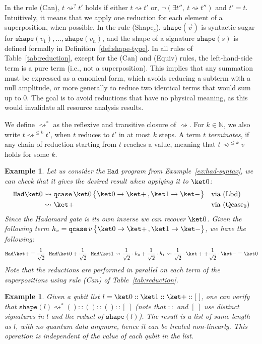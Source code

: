 \documentclass[10pt,a4paper]{article}
\newcommand{\vunit}{()}
\newcommand{\nil}{[~]}
\newcommand{\textqcase}{\ensuremath{\mathtt{qcase}}}
\newcommand{\zket}{\ket 0}
\newcommand{\oket}{\ket 1}
\newcommand{\qcasebase}[2]{
  \textqcase\,#1\left\{\! \begin{aligned} #2 \end{aligned}\right\}
}
\newcommand{\qcase}[3]{
  \qcasebase {#1} {\zket \to #2\,, \oket \to #3}
}
\newcommand{\shape}[1]{\mathtt{shape}(#1)}
\newcommand{\reduces}{\rightsquigarrow}
\newcommand{\sreduces}{\reduces^*}
\newcommand{\zoreduces}{\ensuremath{\reduces^?}}%
\newcommand{\mostreduces}[1]{\ensuremath{\reduces^{\leq #1}}}
\newcommand{\seq}[1]{\overrightarrow{#1}}
\newtheorem{example}[theorem]{Example}
\begin{document}
In the rule (Can), $t\zoreduces t'$  holds if either $t\reduces t'$
or, $\neg(\exists t'',\ t \reduces t'')$ and $t' = t$. Intuitively,
it means that we apply one reduction for each element of a
superposition, when possible.
In the rule (Shape$_c$), $\shape{\seq v}$ is syntactic sugar for $\shape{v_1},
\dots, \shape{v_n}$, and the shape of a signature $\shape s$ is defined
formally in Definition~\ref{def:shape-type}.
In all rules of Table~\ref{tab:reduction}, except for the (Can) and
(Equiv) rules, the left-hand-side term is a pure term (i.e., not a
superposition). This implies that any summation must be
expressed as a canonical form, which avoids reducing
a subterm with a null amplitude, or more generally to reduce two
identical terms that would sum up to $0$.  The goal is to avoid
reductions that have no physical meaning, as this would invalidate
all resource analysis results.

We define $\reduces^*$ as the reflexive and transitive closure of
$\reduces$.
For $k \in \mathbb{N}$, we also write $t \mostreduces k t'$, when $t$
reduces to $t'$ in at most $k$ steps.
A term $t$ \emph{terminates}, if any chain of reduction starting
from $t$ reaches a value, meaning that $t \mostreduces k v$ holds for some $k$.

\begin{example}
  \label{ex:had-semantics}
  Let us consider the $\mathtt{Had}$ program from Example~\ref{ex:had-syntax},
  we can check that it gives the desired result when applying it to $\zket$:
  \[
    \begin{aligned}
      \mathtt{Had} \zket &\reduces \qcase \zket {\ket +}{\ket -}
      &&\text{via (Lbd)} \\
      &\reduces \ket + &&\text{via (Qcase$_0$)}
    \end{aligned}
  \]
  Since the Hadamard gate is its own inverse we can recover $\ket0$.
  Given the following term  $h_v= \qcase{v} {\ket+}{\ket -}$,
  we have the following:
  \[
    \mathtt{Had} \ket + \equiv \frac 1 {\sqrt 2} \cdot \mathtt{Had} \zket +
    \frac 1 {\sqrt 2} \cdot \mathtt{Had} \oket
    \reduces \frac{1}{\sqrt 2} \cdot h_0
    + \frac{1}{\sqrt 2} \cdot h_1 \reduces \frac{1}{\sqrt 2} \cdot \ket + +
    \frac{1}{\sqrt 2} \cdot \ket - \equiv \ket 0
  \]
  Note that the reductions are performed in parallel on each term of the
  superpositions using rule (Can) of Table~\ref{tab:reduction}.
 \end{example}

\begin{example}
  \label{ex:shape-semantics}
  Given a qubit list $l = \zket :: \oket :: \ket + :: \nil$, one can verify that
  $\shape l \sreduces \vunit :: \vunit :: \vunit :: \nil$ (note that $::$ and
  $[\ ]$ use distinct signatures in $l$ and the reduct of $\shape l $).  The
  result is a list of same length as $l$, with no quantum data anymore, hence
  it can be treated non-linearly. This operation is independent of the value of
  each qubit in the list.
\end{example}
\end{document}

